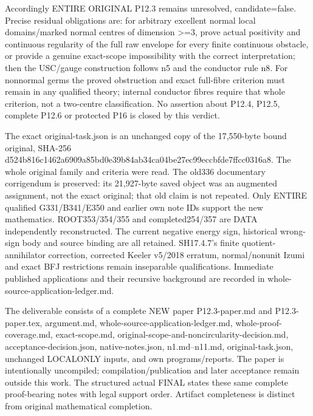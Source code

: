 \documentclass[11pt]{article}
\begin{document}
Accordingly ENTIRE ORIGINAL P12.3 remains unresolved, candidate=false. Precise residual obligations are: for arbitrary excellent normal local domains/marked normal centres of dimension >=3, prove actual positivity and continuous regularity of the full raw envelope for every finite continuous obstacle, or provide a genuine exact-scope impossibility with the correct interpretation; then the USC/gauge construction follows n5 and the conductor rule n8. For nonnormal germs the proved obstruction and exact full-fibre criterion must remain in any qualified theory; internal conductor fibres require that whole criterion, not a two-centre classification. No assertion about P12.4, P12.5, complete P12.6 or protected P16 is closed by this verdict.

The exact original-task.json is an unchanged copy of the 17,550-byte bound original, SHA-256 d524b816c1462a6909a85bd0e39b84ab34ca04be27ec99eccbfde7ffcc0316a8. The whole original family and criteria were read. The old336 documentary corrigendum is preserved: its 21,927-byte saved object was an augmented assignment, not the exact original; that old claim is not repeated. Only ENTIRE qualified G331/B341/E350 and earlier own note IDs support the new mathematics. ROOT353/354/355 and completed254/357 are DATA independently reconstructed. The current negative energy sign, historical wrong-sign body and source binding are all retained. SH17.4.7's finite quotient-annihilator correction, corrected Keeler v5/2018 erratum, normal/nonunit Izumi and exact BFJ restrictions remain inseparable qualifications. Immediate published applications and their recursive background are recorded in whole-source-application-ledger.md.

The deliverable consists of a complete NEW paper P12.3-paper.md and P12.3-paper.tex, argument.md, whole-source-application-ledger.md, whole-proof-coverage.md, exact-scope.md, original-scope-and-noncircularity-decision.md, acceptance-decision.json, native-notes.json, n1.md--n11.md, original-task.json, unchanged LOCALONLY inputs, and own programs/reports. The paper is intentionally uncompiled; compilation/publication and later acceptance remain outside this work. The structured actual FINAL states these same complete proof-bearing notes with legal support order. Artifact completeness is distinct from original mathematical completion.
\end{document}
